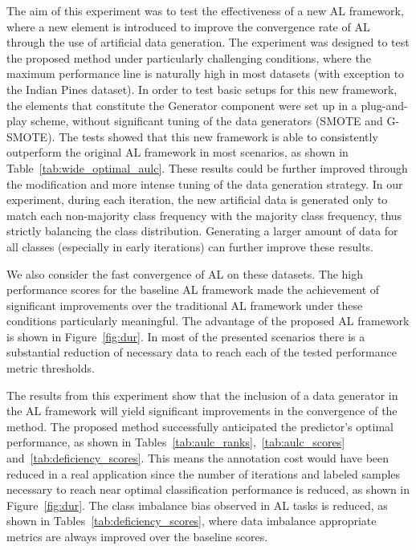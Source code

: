 \documentclass[parskip=full]{scrartcl}
\begin{document}
The aim of this experiment was to test the effectiveness of a new AL framework,
where a new element is introduced to improve the convergence rate of AL through
the use of artificial data generation. The experiment was designed to test the
proposed method under particularly challenging conditions, where the maximum
performance line is naturally high in most datasets (with exception to the
Indian Pines dataset). In order to test basic setups for this new framework,
the elements that constitute the Generator component were set up in a
plug-and-play scheme, without significant tuning of the data generators (SMOTE
and G-SMOTE). The tests showed that this new framework is able to consistently
outperform the original AL framework in most scenarios, as shown in
Table~\ref{tab:wide_optimal_aulc}. These results could be further improved
through the modification and more intense tuning of the data generation
strategy. In our experiment, during each iteration, the new artificial data is
generated only to match each non-majority class frequency with the majority
class frequency, thus strictly balancing the class distribution. Generating a
larger amount of data for all classes (especially in early iterations) can
further improve these results. 

We also consider the fast convergence of AL on these datasets. The high
performance scores for the baseline AL framework made the achievement of
significant improvements over the traditional AL framework under
these conditions particularly meaningful. The advantage of the proposed AL
framework is shown in Figure~\ref{fig:dur}. In most of the presented scenarios
there is a substantial reduction of necessary data to reach each of the tested
performance metric thresholds. 

The results from this experiment show that the inclusion of a data generator in
the AL framework will yield significant improvements in the convergence of the
method. The proposed method successfully anticipated the predictor's optimal
performance, as shown in Tables~\ref{tab:aulc_ranks},~\ref{tab:aulc_scores}
and~\ref{tab:deficiency_scores}. This means the annotation cost would have been
reduced in a real application since the number of iterations and labeled
samples necessary to reach near optimal classification performance is reduced,
as shown in Figure~\ref{fig:dur}. The class imbalance bias observed in AL tasks
is reduced, as shown in Tables~\ref{tab:deficiency_scores}, where data
imbalance appropriate metrics are always improved over the baseline scores.



\end{document}
